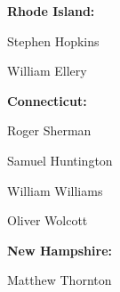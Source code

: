 \begin{decliststates}
\item \textbf{Rhode Island:}
\begin{declistnames}
\item Stephen Hopkins
\item William Ellery
\end{declistnames}

\item \textbf{Connecticut:}
\begin{declistnames}
\item Roger Sherman
\item Samuel Huntington
\item William Williams
\item Oliver Wolcott
\end{declistnames}

\item \textbf{New Hampshire:}
\begin{declistnames}
\item Matthew Thornton
\end{declistnames}
\end{decliststates}

